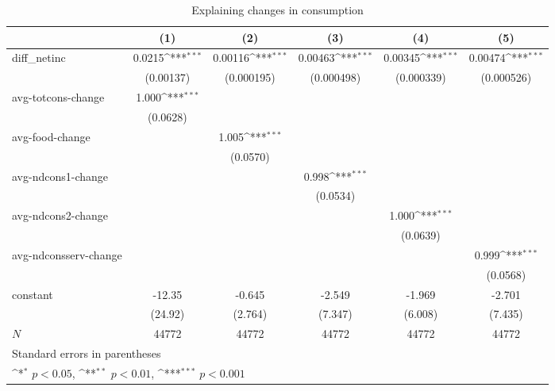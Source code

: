\begin{table}[!h]\centering
\def\sym#1{\ifmmode^{#1}\else\(^{#1}\)\fi}
\caption{\label{tab:2.1A-deltacons} Explaining changes in consumption}
\begin{tabular}{l*{5}{c}}
\hline\hline
            &\multicolumn{1}{c}{(1)}         &\multicolumn{1}{c}{(2)}         &\multicolumn{1}{c}{(3)}         &\multicolumn{1}{c}{(4)}         &\multicolumn{1}{c}{(5)}         \\
\hline
diff\_netinc &      0.0215\sym{***}&     0.00116\sym{***}&     0.00463\sym{***}&     0.00345\sym{***}&     0.00474\sym{***}\\
            &   (0.00137)         &  (0.000195)         &  (0.000498)         &  (0.000339)         &  (0.000526)         \\
avg-totcons-change&       1.000\sym{***}&                     &                     &                     &                     \\
            &    (0.0628)         &                     &                     &                     &                     \\
avg-food-change&                     &       1.005\sym{***}&                     &                     &                     \\
            &                     &    (0.0570)         &                     &                     &                     \\
avg-ndcons1-change&                     &                     &       0.998\sym{***}&                     &                     \\
            &                     &                     &    (0.0534)         &                     &                     \\
avg-ndcons2-change&                     &                     &                     &       1.000\sym{***}&                     \\
            &                     &                     &                     &    (0.0639)         &                     \\
avg-ndconsserv-change&                     &                     &                     &                     &       0.999\sym{***}\\
            &                     &                     &                     &                     &    (0.0568)         \\
constant    &      -12.35         &      -0.645         &      -2.549         &      -1.969         &      -2.701         \\
            &     (24.92)         &     (2.764)         &     (7.347)         &     (6.008)         &     (7.435)         \\
\hline
\(N\)       &       44772         &       44772         &       44772         &       44772         &       44772         \\
\hline\hline
\multicolumn{6}{l}{\footnotesize Standard errors in parentheses}\\
\multicolumn{6}{l}{\footnotesize \sym{*} \(p<0.05\), \sym{**} \(p<0.01\), \sym{***} \(p<0.001\)}\\
\end{tabular}
\end{table}
